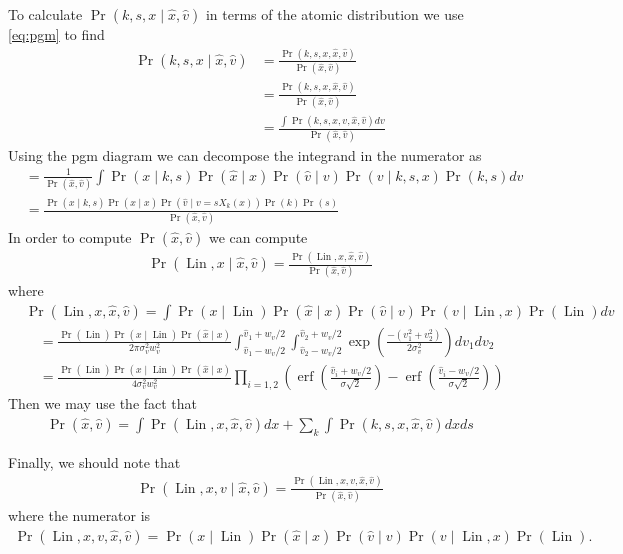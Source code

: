 \documentclass[12pt]{amsart}
\DeclareMathOperator{\Lin}{Lin}
\DeclareMathOperator{\erf}{erf}
\begin{document}
To calculate $\Pr(k,s,x \mid \hat{x}, \hat{v} )$ in terms of the atomic distribution we use \eqref{eq:pgm} to find
\begin{align*}
	\Pr( k,s,x \mid \hat{x}, \hat{v}) &= \frac{ \Pr(k, s, x, \hat{x}, \hat{v} ) }{ \Pr( \hat{x}, \hat{v} ) } \\
		&= \frac{ \Pr(k,s,x, \hat{x}, \hat{v} ) }{ \Pr( \hat{x}, \hat{v}) } \\
		&= \frac{ \int \Pr(k, s, x, v, \hat{x}, \hat{v} ) dv }{ \Pr( \hat{x}, \hat{v} ) }
\end{align*}
Using the pgm diagram we can decompose the integrand in the numerator as
\begin{align*}
	&= \frac{1}{ \Pr( \hat{x}, \hat{v} ) } \int \Pr( x \mid k,s) \Pr( \hat{x} \mid x ) \Pr( \hat{v} \mid v) \Pr( v \mid k,s,x) \Pr(k,s) dv \\
	&= \frac{ \Pr( x \mid k,s) \Pr( \hat{x} \mid x ) \Pr( \hat{v} \mid v = s X_k(x) ) \Pr(k) \Pr(s) }{ \Pr( \hat{x} , \hat{v} ) }
\end{align*}
In order to compute $\Pr( \hat{x}, \hat{v})$ we can compute
\begin{align*}
	\Pr( \Lin , x \mid \hat{x} , \hat{v} ) = \frac{ \Pr( \Lin , x, \hat{x}, \hat{v} ) }{ \Pr( \hat{x}, \hat{v} ) } 
\end{align*}
where
\begin{align*}
	&\Pr( \Lin, x, \hat{x}, \hat{v} ) = \int \Pr( x \mid \Lin ) \Pr( \hat{x} \mid x ) \Pr( \hat{v} \mid v) \Pr( v \mid \Lin ,x) \Pr(\Lin) dv \\
	&\quad = \frac{ \Pr( \Lin ) \Pr( x \mid \Lin ) \Pr( \hat{x} \mid x ) }{ 2\pi \sigma_v^2 w_v^2} \int_{\hat{v}_1 - w_v/2}^{\hat{v}_1 + w_v/2}  \int_{\hat{v}_2 - w_v/2}^{\hat{v}_2 + w_v/2} \exp \left( \frac{ - (v_1^2 + v_2^2) }{ 2 \sigma_v^2} \right) dv_1 dv_2 \\
	&\quad = \frac{ \Pr( \Lin ) \Pr( x \mid \Lin ) \Pr( \hat{x} \mid x ) }{ 4 \sigma_v^2 w_v^2} \prod_{i=1,2} \left( \erf \left( \frac{ \hat{v}_i + w_v/2}{ \sigma \sqrt{2} } \right) - \erf \left( \frac{ \hat{v}_i - w_v/2}{ \sigma \sqrt{2} } \right) \right)
\end{align*}
Then we may use the fact that
\begin{align*}
	\Pr( \hat{x}, \hat{v} ) = \int \Pr( \Lin , x , \hat{x}, \hat{v} )dx  + \sum_{k} \int \Pr( k,s, x , \hat{x} , \hat{v} ) dx ds
\end{align*}

Finally, we should note that
\begin{align*}
	\Pr( \Lin , x, v \mid \hat{x}, \hat{v} ) = \frac{ \Pr( \Lin , x, v ,\hat{x}, \hat{v} ) }{ \Pr( \hat{x} , \hat{v} ) }
\end{align*}
where the numerator is
\begin{align*}
	\Pr( \Lin, x, v, \hat{x}, \hat{v} ) = \Pr( x \mid \Lin ) \Pr( \hat{x} \mid x ) \Pr( \hat{v} \mid v) \Pr( v \mid \Lin ,x) \Pr(\Lin).
\end{align*}
\end{document}
